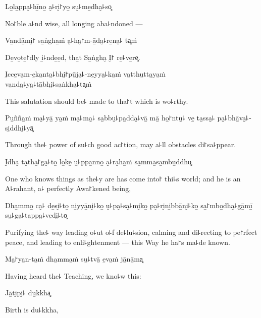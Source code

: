 Lo̱la̱ppa̮꜕hī̱no̱ a̮꜕ri̮꜓yo̱ su̮꜕me̱dha̮꜕so͓

\begin{english}
  No꜓ble a꜕nd wise, all longing aba꜕ndoned ---
\end{english}

Va̱ndā̱mi̮꜓ sa̱ṅgha̱ṁ a̮꜕ha̮꜓m-ā̱da̮꜕re̱na̮꜕ ta͓ṁ

\begin{english}
  De̱vo̱te̱꜓dly i̱꜕nde̱e̱d, tha̱t Sa̱ṅgha̮ I̮꜓ re̱꜕ve̱re͓.
\end{english}

I̱cce̱va̮m-e̱ka̱nta̮꜕bhi̮꜓pū̱ja̮꜕-ne̱yya̮꜕ka̱ṁ va̱tthu̱tta̮ya̱ṁ \\va̱nda̮꜕ya̮꜕tā̱bhi̮꜕sa̱ṅkha̮꜕ta͓ṁ

\begin{english}
  This salutation should be꜕ made to tha꜓t which is wo꜕rthy.
\end{english}

Pu̱ñña̱ṁ ma̮꜕yā̱ ya̱ṁ ma̮꜕ma̮꜕ sa̱bbu̮꜕pa̱dda̮꜕vā̱ mā̱ ho̱꜓ntu̮꜕ ve̱ ta̱ssa̮꜕ pa̮꜕bhā̱va̮꜕-si̱ddhi̮꜕yā͓

\begin{english}
  Through the꜕ power of su꜕ch good ac꜓tion, may a꜕ll obstacles di꜓sa꜕ppear.
\end{english}

I̮dha̮ ta̮thā̱꜓ga̮꜕to̱ lo̱ke̱ u̱꜕ppa̱nno̱ a̮꜕ra̮ha̱ṁ sa̱mmā̱sa̱mbu̱ddho͓

\begin{english}
  One who knows things as the꜕y are has come into꜓ thi꜕s world; and he is an A꜕rahant, a꜕ perfectly Awa꜓kened being,
\end{english}

Dha̱mmo̱ ca̮꜕ de̱si̮꜕to̱ ni̱yyā̱ni̮꜕ko̱ u̮꜕pa̮꜕sa̮꜕mi̮ko̱ pa̮꜕ri̮ni̱bbā̱ni̮꜕ko̱ sa̱꜓mbo̱dha̮꜕gā̱mī̱ su̮꜕ga̮꜕ta̱ppa̮꜕ve̱di̮꜕to͓

\begin{english}
  Purifying the꜕ way leading o꜕ut o꜕f de꜕lu꜕sion, calming and di꜕recting to pe꜓rfect peace, and leading to enli꜕ghtenment --- this Way he ha꜓s ma꜕de known.
\end{english}

Ma̮꜓ya̱n-ta̱ṁ dha̱mma̱ṁ su̱꜕tvā̱ e̱va̱ṁ jā̱nā̱ma͓

\begin{english}
  Having heard the꜕ Teaching, we kno꜕w this:
\end{english}

Jā̱ti̮pi̮꜕ du̱kkhā͓

\begin{english}
  Birth is du꜕kkha,
\end{english}

